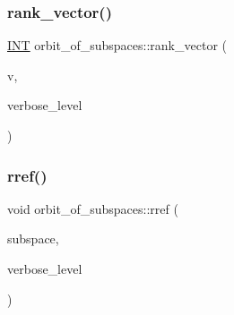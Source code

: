 \mbox{\label{classorbit__of__subspaces_af50d49d04ce89cb5b061d03db31d84cc}} 
\subsubsection{\texorpdfstring{rank\+\_\+vector()}{rank\_vector()}}
{\footnotesize\ttfamily \mbox{\hyperlink{galois_8h_a09fddde158a3a20bd2dcadb609de11dc}{I\+NT}} orbit\+\_\+of\+\_\+subspaces\+::rank\+\_\+vector (\begin{DoxyParamCaption}\item[{\mbox{\hyperlink{galois_8h_a09fddde158a3a20bd2dcadb609de11dc}{I\+NT}} $\ast$}]{v,  }\item[{\mbox{\hyperlink{galois_8h_a09fddde158a3a20bd2dcadb609de11dc}{I\+NT}}}]{verbose\+\_\+level }\end{DoxyParamCaption})}

\mbox{\label{classorbit__of__subspaces_a35f848711624544bf7d73df13b32152a}} 
\subsubsection{\texorpdfstring{rref()}{rref()}}
{\footnotesize\ttfamily void orbit\+\_\+of\+\_\+subspaces\+::rref (\begin{DoxyParamCaption}\item[{\mbox{\hyperlink{galois_8h_a09fddde158a3a20bd2dcadb609de11dc}{I\+NT}} $\ast$}]{subspace,  }\item[{\mbox{\hyperlink{galois_8h_a09fddde158a3a20bd2dcadb609de11dc}{I\+NT}}}]{verbose\+\_\+level }\end{DoxyParamCaption})}

\mbox{\label{classorbit__of__subspaces_a26de37849f6d21e531a9541245d766c1}} 

